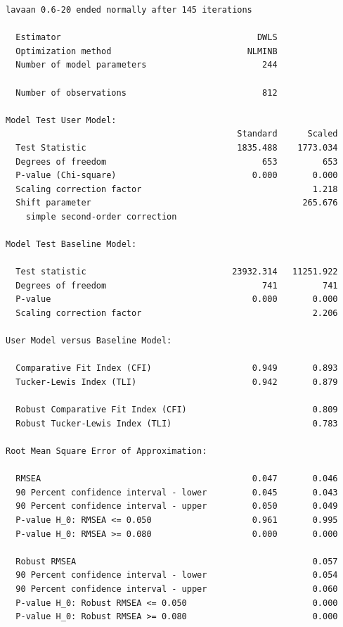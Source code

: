 \documentclass[
  letterpaper,
  DIV=11,
  numbers=noendperiod]{scrartcl}
\begin{document}
\begin{verbatim}
lavaan 0.6-20 ended normally after 145 iterations

  Estimator                                       DWLS
  Optimization method                           NLMINB
  Number of model parameters                       244

  Number of observations                           812

Model Test User Model:
                                              Standard      Scaled
  Test Statistic                              1835.488    1773.034
  Degrees of freedom                               653         653
  P-value (Chi-square)                           0.000       0.000
  Scaling correction factor                                  1.218
  Shift parameter                                          265.676
    simple second-order correction                                

Model Test Baseline Model:

  Test statistic                             23932.314   11251.922
  Degrees of freedom                               741         741
  P-value                                        0.000       0.000
  Scaling correction factor                                  2.206

User Model versus Baseline Model:

  Comparative Fit Index (CFI)                    0.949       0.893
  Tucker-Lewis Index (TLI)                       0.942       0.879
                                                                  
  Robust Comparative Fit Index (CFI)                         0.809
  Robust Tucker-Lewis Index (TLI)                            0.783

Root Mean Square Error of Approximation:

  RMSEA                                          0.047       0.046
  90 Percent confidence interval - lower         0.045       0.043
  90 Percent confidence interval - upper         0.050       0.049
  P-value H_0: RMSEA <= 0.050                    0.961       0.995
  P-value H_0: RMSEA >= 0.080                    0.000       0.000
                                                                  
  Robust RMSEA                                               0.057
  90 Percent confidence interval - lower                     0.054
  90 Percent confidence interval - upper                     0.060
  P-value H_0: Robust RMSEA <= 0.050                         0.000
  P-value H_0: Robust RMSEA >= 0.080                         0.000


\end{verbatim}
\end{document}
